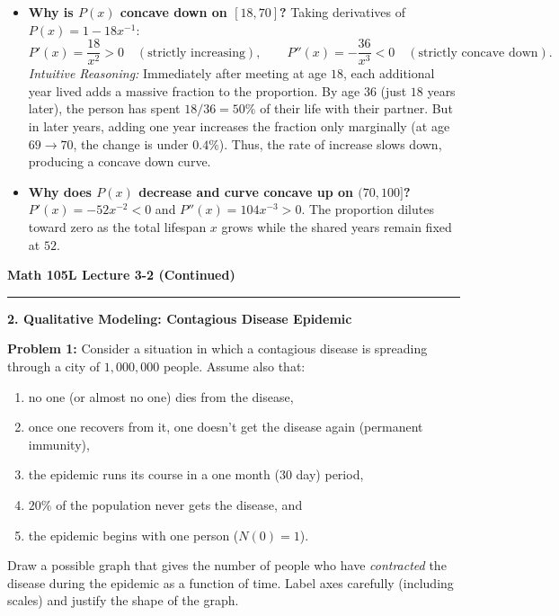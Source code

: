 \documentclass[10.5pt]{article}
\begin{document}
\vspace{-0.05in}
\begin{itemize}[leftmargin=1.2em, topsep=1pt, itemsep=2pt]
  \item \textbf{Why is $P(x)$ concave down on $[18, 70]$?}
  Taking derivatives of $P(x) = 1 - 18 x^{-1}$:
  \[
  P'(x) = \frac{18}{x^2} > 0 \quad (\text{strictly increasing}), \qquad P''(x) = -\frac{36}{x^3} < 0 \quad (\text{strictly concave down}).
  \]
  \textit{Intuitive Reasoning:} Immediately after meeting at age $18$, each additional year lived adds a massive fraction to the proportion. By age $36$ (just $18$ years later), the person has spent $18/36 = 50\%$ of their life with their partner. But in later years, adding one year increases the fraction only marginally (at age $69 \to 70$, the change is under $0.4\%$). Thus, the rate of increase slows down, producing a concave down curve.
  \item \textbf{Why does $P(x)$ decrease and curve concave up on $(70, 100]$?}
  $P'(x) = -52 x^{-2} < 0$ and $P''(x) = 104 x^{-3} > 0$. The proportion dilutes toward zero as the total lifespan $x$ grows while the shared years remain fixed at $52$.
\end{itemize}

\newpage

\noindent \textbf{\large Math 105L \hfill Lecture 3-2 (Continued)}\\[-5pt]
\rule{\textwidth}{1.2pt}

\vspace{0.04in}

\textbf{\large 2. Qualitative Modeling: Contagious Disease Epidemic}

\begin{tcolorbox}[colback=boxbg, colframe=boxframe, boxrule=0.8pt, arc=3pt, left=8pt, right=8pt, top=4pt, bottom=4pt]
\textbf{Problem 1:} Consider a situation in which a contagious disease is spreading through a city of $1,000,000$ people. Assume also that:
\begin{enumerate}[label=(\alph*), topsep=1pt, itemsep=1pt]
  \item no one (or almost no one) dies from the disease,
  \item once one recovers from it, one doesn't get the disease again (permanent immunity),
  \item the epidemic runs its course in a one month ($30$ day) period,
  \item $20\%$ of the population never gets the disease, and
  \item the epidemic begins with one person ($N(0) = 1$).
\end{enumerate}
Draw a possible graph that gives the number of people who have \emph{contracted} the disease during the epidemic as a function of time. Label axes carefully (including scales) and justify the shape of the graph.
\end{tcolorbox}
\end{document}
